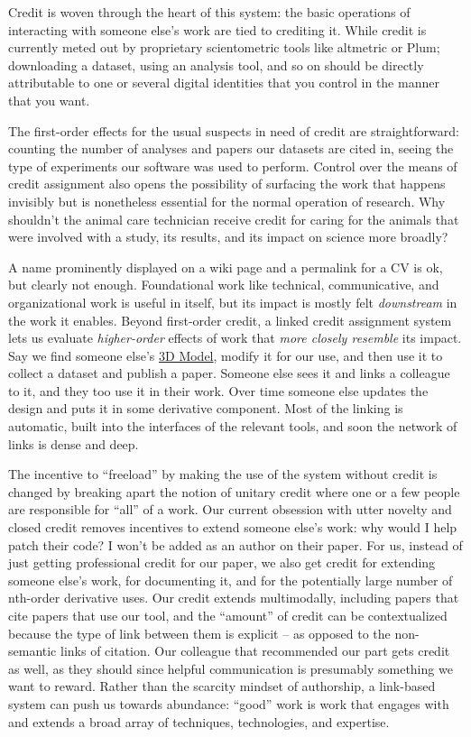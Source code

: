 Credit is woven through the heart of this system: the basic operations
of interacting with someone else's work are tied to crediting it. While
credit is currently meted out by proprietary scientometric tools like
altmetric or Plum; downloading a dataset, using an analysis tool, and so
on should be directly attributable to one or several digital identities
that you control in the manner that you want.

The first-order effects for the usual suspects in need of credit are
straightforward: counting the number of analyses and papers our datasets
are cited in, seeing the type of experiments our software was used to
perform. Control over the means of credit assignment also opens the
possibility of surfacing the work that happens invisibly but is
nonetheless essential for the normal operation of research. Why
shouldn't the animal care technician receive credit for caring for the
animals that were involved with a study, its results, and its impact on
science more broadly?

A name prominently displayed on a wiki page and a permalink for a CV is
ok, but clearly not enough. Foundational work like technical,
communicative, and organizational work is useful in itself, but its
impact is mostly felt \emph{downstream} in the work it enables. Beyond
first-order credit, a linked credit assignment system lets us evaluate
\emph{higher-order} effects of work that \emph{more closely resemble}
its impact. Say we find someone else's
\href{https://wiki.auto-pi-lot.com/index.php/3D_CAD}{3D Model}, modify
it for our use, and then use it to collect a dataset and publish a
paper. Someone else sees it and links a colleague to it, and they too
use it in their work. Over time someone else updates the design and puts
it in some derivative component. Most of the linking is automatic, built
into the interfaces of the relevant tools, and soon the network of links
is dense and deep.

The incentive to ``freeload'' by making the use of the system without
credit is changed by breaking apart the notion of unitary credit where
one or a few people are responsible for ``all'' of a work. Our current
obsession with utter novelty and closed credit removes incentives to
extend someone else's work: why would I help patch their code? I won't
be added as an author on their paper. For us, instead of just getting
professional credit for our paper, we also get credit for extending
someone else's work, for documenting it, and for the potentially large
number of nth-order derivative uses. Our credit extends multimodally,
including papers that cite papers that use our tool, and the ``amount''
of credit can be contextualized because the type of link between them is
explicit -- as opposed to the non-semantic links of citation. Our
colleague that recommended our part gets credit as well, as they should
since helpful communication is presumably something we want to reward.
Rather than the scarcity mindset of authorship, a link-based system can
push us towards abundance: ``good'' work is work that engages with and
extends a broad array of techniques, technologies, and expertise.

